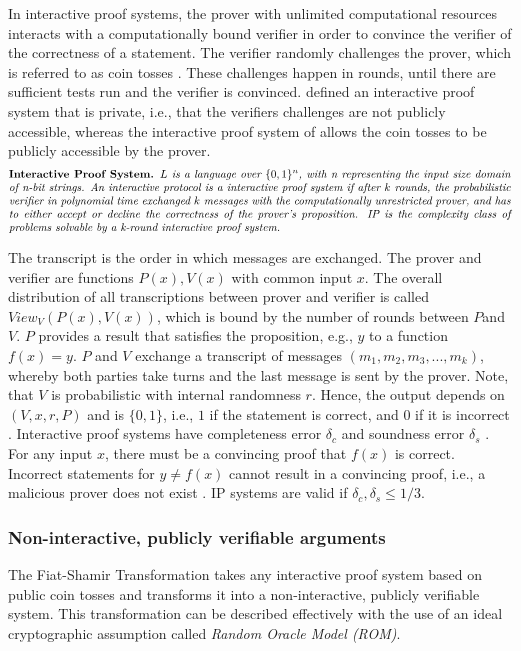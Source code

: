 In interactive proof systems, the prover with unlimited computational resources interacts with a computationally bound verifier in order to convince the verifier of the correctness of a statement. The verifier randomly challenges the prover, which is referred to as coin tosses \citep{GoldwasserCoinTosses}. These challenges happen in rounds, until there are sufficient tests run and the verifier is convinced. \citet{GoldwasserIPs} defined an interactive proof system that is private, i.e., that the verifiers challenges are not publicly accessible, whereas the interactive proof system of \citet{BabaiIPs} allows the coin tosses to be publicly accessible by the prover.
\begin{align*}
    \text{\parbox{450pt}{\textbf{Interactive Proof System.} \textit{\(L\) is a language over \(\{0,1\}^n\), with n representing the input size domain of n-bit strings. An interactive protocol is a interactive proof system if after \(k\) rounds, the probabilistic verifier in polynomial time exchanged \(k\) messages with the computationally unrestricted prover, and has to either accept or decline the correctness of the prover's proposition. IP is the complexity class of problems solvable by a k-round interactive proof system.}}}
\end{align*}
  
The transcript is the order in which messages are exchanged. The prover and verifier are functions \(P(x), V(x)\) with common input \(x\). The overall distribution of all transcriptions between prover and verifier is called \(View_V(P(x), V(x))\), which is bound by the number of rounds between \(P\)and \(V\). \(P\) provides a result that satisfies the proposition, e.g., \(y\) to a function \(f(x) = y\). \(P\) and \(V\) exchange a transcript of messages \((m_1, m_2, m_3, ..., m_k)\), whereby both parties take turns and the last message is sent by the prover. Note, that \(V\) is probabilistic with internal randomness \(r\). Hence, the output depends on \((V, x, r, P)\) and is \(\{0,1\}\), i.e., \(1\) if the statement is correct, and \(0\) if it is incorrect \citep{GoldwasserIPs, BabaiIPs}. Interactive proof systems have completeness error \(\delta_c\) and soundness error \(\delta_s\) . For any input \(x\), there must be a convincing proof that \(f(x)\) is correct. Incorrect statements for \(y \neq f(x)\) cannot result in a convincing proof, i.e., a malicious prover does not exist \citep{Thaler}. IP systems are valid if \(\delta_c, \delta_s \leq 1/3\).

\subsubsection{Non-interactive, publicly verifiable arguments}
The Fiat-Shamir Transformation takes any interactive proof system based on public coin tosses and transforms it into a non-interactive, publicly verifiable system. This transformation can be described effectively with the use of an ideal cryptographic assumption called \textit{Random Oracle Model (ROM)}. 
